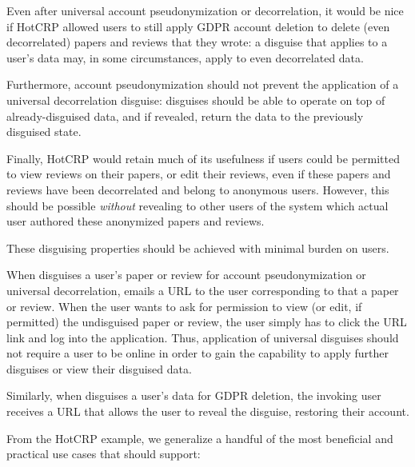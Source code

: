 Even after universal account pseudonymization or decorrelation, it would be nice if HotCRP allowed
users to still apply GDPR account deletion to delete (even decorrelated) papers and reviews that they
wrote: a disguise that applies to a user's data may, in some circumstances, apply to even decorrelated data.

Furthermore, account pseudonymization should not prevent the application of a universal
decorrelation disguise: disguises should be able to operate on top of already-disguised data, and if
revealed, return the data to the previously disguised state. 

Finally, HotCRP would retain much of its usefulness if users could be permitted to view
reviews on their papers, or edit their reviews, even if these papers and reviews have been
decorrelated and belong to anonymous users.
However, this should be possible \emph{without} revealing to other users of the system which
actual user authored these anonymized papers and reviews.

 These disguising properties should be achieved with minimal burden on
users. 

When \sys disguises a user's paper or review for account pseudonymization or universal decorrelation,
\sys emails a URL to the user corresponding to that a paper or review.  When the user wants to ask
for permission to view (or edit, if permitted) the undisguised paper or review, the user simply has to click the URL link
and log into the application. 
Thus, application of universal disguises should not require a user to be
online in order to gain the capability to apply further disguises or view their disguised data.

Similarly, when \sys disguises a user's data for GDPR deletion, the invoking user receives a URL
that allows the user to reveal the disguise, restoring their account.

From the HotCRP example, we generalize a handful of the most beneficial and practical use cases
that \sys should support:


